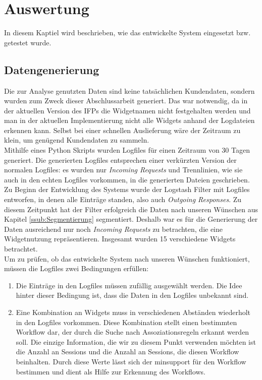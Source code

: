 \section{Auswertung}
\label{sec:Auswertung}
In diesem Kaptiel wird beschrieben, wie das entwickelte System eingesetzt bzw. getestet wurde.
\subsection{Datengenerierung}
\label{sub:Datengenerierung}

Die zur Analyse genutzten Daten sind keine tatsächlichen Kundendaten, sondern wurden zum Zweck dieser Abschlussarbeit generiert. Das war notwendig, da in der aktuellen Version des IFPs die Widgetnamen nicht festgehalten werden und man in der aktuellen Implementierung nicht alle Widgets anhand der Logdateien erkennen kann. Selbst bei einer schnellen Auslieferung wäre der Zeitraum zu klein, um genügend Kundendaten zu sammeln.\\
Mithilfe eines Python Skripts wurden Logfiles für einen Zeitraum von 30 Tagen generiert. Die generierten Logfiles entsprechen einer verkürzten Version der normalen Logfiles: es wurden nur \textit{Incoming Requests} und Trennlinien, wie sie auch in den echten Logfiles vorkommen, in die generierten Dateien geschrieben. Zu Beginn der Entwicklung des Systems wurde der Logstash Filter mit Logfiles entworfen, in denen alle Einträge standen, also auch \textit{Outgoing Responses}. Zu diesem Zeitpunkt hat der Filter erfolgreich die Daten nach unseren Wünschen aus Kapitel \ref{ssub:Segmentierung} segmentiert. Deshalb war es für die Generierung der Daten ausreichend nur noch \textit{Incoming Requests} zu betrachten, die eine Widgetnutzung repräsentieren. Insgesamt wurden 15 verschiedene Widgets betrachtet.\\
Um zu prüfen, ob das entwickelte System nach unseren Wünschen funktioniert, müssen die Logfiles zwei Bedingungen erfüllen:\\
\begin{enumerate}
	\item Die Einträge in den Logfiles müssen zufällig ausgewählt werden. Die Idee hinter dieser Bedingung ist, dass die Daten in den Logfiles unbekannt sind.\\
	\item Eine Kombination an Widgets muss in verschiedenen Abständen wiederholt in den Logfiles vorkommen. Diese Kombination stellt einen bestimmten Workflow dar, der durch die Suche nach Assoziationsregeln erkannt werden soll. Die einzige Information, die wir zu diesem Punkt verwenden möchten ist die Anzahl an Sessions und die Anzahl an Sessions, die diesen Workflow beinhalten. Durch diese Werte lässt sich der minsupport für den Workflow bestimmen und dient als Hilfe zur Erkennung des Workflows.
\end{enumerate}
